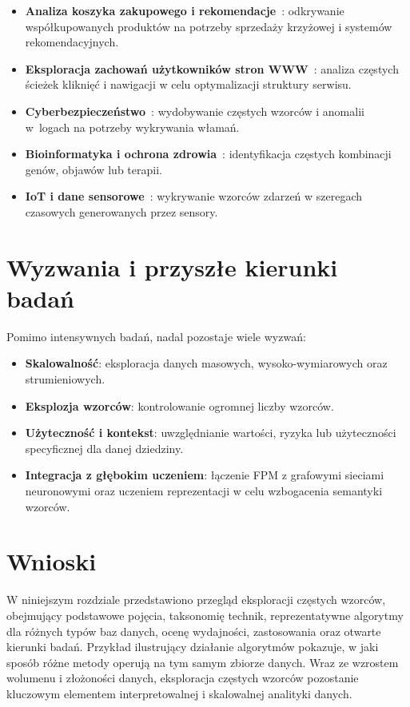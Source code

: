 \begin{itemize}
\item \textbf{Analiza koszyka zakupowego i rekomendacje}~\cite{han2007fpm_survey}: odkrywanie współkupowanych produktów na potrzeby sprzedaży krzyżowej i systemów rekomendacyjnych.
\item \textbf{Eksploracja zachowań użytkowników stron WWW}~\cite{mba2023}: analiza częstych ścieżek kliknięć i nawigacji w celu optymalizacji struktury serwisu.
\item \textbf{Cyberbezpieczeństwo}~\cite{weblog2006}: wydobywanie częstych wzorców i anomalii w~logach na potrzeby wykrywania włamań.
\item \textbf{Bioinformatyka i ochrona zdrowia}~\cite{bioinf2013}: identyfikacja częstych kombinacji genów, objawów lub terapii.
\item \textbf{IoT i dane sensorowe}~\cite{dharpp2022}: wykrywanie wzorców zdarzeń w szeregach czasowych generowanych przez sensory.
\end{itemize}


\section{Wyzwania i przyszłe kierunki badań}
\label{sec:challenges}
Pomimo intensywnych badań, nadal pozostaje wiele wyzwań:

\begin{itemize}
\item \textbf{Skalowalność}: eksploracja danych masowych, wysoko-wymiarowych oraz strumieniowych.
\item \textbf{Eksplozja wzorców}: kontrolowanie ogromnej liczby wzorców.
\item \textbf{Użyteczność i kontekst}: uwzględnianie wartości, ryzyka lub użyteczności specyficznej dla danej dziedziny.
\item \textbf{Integracja z głębokim uczeniem}: łączenie FPM z grafowymi sieciami neuronowymi oraz uczeniem reprezentacji w celu wzbogacenia semantyki wzorców.
\end{itemize}


\section{Wnioski}
\label{sec:conclusion}
W niniejszym rozdziale przedstawiono przegląd eksploracji częstych wzorców, obejmujący podstawowe pojęcia, taksonomię technik, reprezentatywne algorytmy dla różnych typów baz danych, ocenę wydajności, zastosowania oraz otwarte kierunki badań. Przykład ilustrujący działanie algorytmów pokazuje, w jaki sposób różne metody operują na tym samym zbiorze danych. Wraz ze wzrostem wolumenu i złożoności danych, eksploracja częstych wzorców pozostanie kluczowym elementem interpretowalnej i skalowalnej analityki danych.



